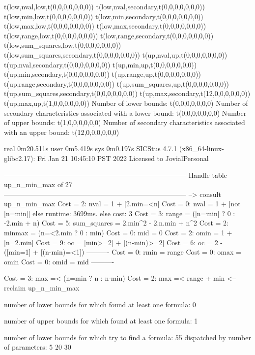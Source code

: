 t(low,nval,low,t(0,0,0,0,0,0,0))
t(low,nval,secondary,t(0,0,0,0,0,0,0))
t(low,min,low,t(0,0,0,0,0,0,0))
t(low,min,secondary,t(0,0,0,0,0,0,0))
t(low,max,low,t(0,0,0,0,0,0,0))
t(low,max,secondary,t(0,0,0,0,0,0,0))
t(low,range,low,t(0,0,0,0,0,0,0))
t(low,range,secondary,t(0,0,0,0,0,0,0))
t(low,sum_squares,low,t(0,0,0,0,0,0,0))
t(low,sum_squares,secondary,t(0,0,0,0,0,0,0))
t(up,nval,up,t(0,0,0,0,0,0,0))
t(up,nval,secondary,t(0,0,0,0,0,0,0))
t(up,min,up,t(0,0,0,0,0,0,0))
t(up,min,secondary,t(0,0,0,0,0,0,0))
t(up,range,up,t(0,0,0,0,0,0,0))
t(up,range,secondary,t(0,0,0,0,0,0,0))
t(up,sum_squares,up,t(0,0,0,0,0,0,0))
t(up,sum_squares,secondary,t(0,0,0,0,0,0,0))
t(up,max,secondary,t(12,0,0,0,0,0,0))
t(up,max,up,t(1,0,0,0,0,0,0))
Number of lower bounds:                                             t(0,0,0,0,0,0,0)
Number of secondary characteristics associated with a lower bound:  t(0,0,0,0,0,0,0)
Number of upper bounds:                                             t(1,0,0,0,0,0,0)
Number of secondary characteristics associated with an upper bound: t(12,0,0,0,0,0,0)

real	0m20.511s
user	0m5.419s
sys	0m0.197s
SICStus 4.7.1 (x86_64-linux-glibc2.17): Fri Jan 21 10:45:10 PST 2022
Licensed to JovialPersonal


--------------------------------------------------------------------------------
Handle table up_n_min_max of 27
--------------------------------------------------------------------------------
--> consult up_n_min_max
Cost =  2:  nval        = 1 + [2.min=<n]
Cost =  0:  nval        = 1 + [not [n=min]]
else runtime: 3699ms. else cost: 3
Cost =  3:  range       = ([n=min] ? 0 : -2.min + n) %
Cost =  5:  sum_squares = 2.min^2 - 2.n.min + n^2
Cost =  2:  minmax      = (n=<2.min ? 0 : min)
Cost =  0:  mid         = 0
Cost =  2:  omin        = 1 + [n=2.min]
Cost =  9:  oc          = [min>=2] + [(n-min)>=2]
Cost =  6:  oc          = 2 - ([min=1] + [(n-min)=<1])
----------
Cost =  0:  rmin        = range
Cost =  0:  omax        = omin
Cost =  0:  omid        = mid
----------

Cost =  3:  max =< (n=min ? n : n-min)
Cost =  2:  max =< range + min
<-- reclaim up_n_min_max

number of lower bounds for which found at least one formula: 0

number of upper bounds for which found at least one formula: 1

number of lower bounds for which try to find a formula: 55
dispatched by number of parameters: 5  20  30

